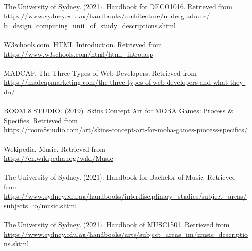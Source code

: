 \documentclass{article}
\begin{document}
	\\
	The University of Sydney. (2021). Handbook for DECO1016. Retrieved from\\ \url{https://www.sydney.edu.au/handbooks/architecture/undergraduate/
	b_design_computing_unit_of_study_descriptions.shtml}\\
	\\
	W3schools.com. HTML Introduction. Retrieved from\\
    \url{https://www.w3schools.com/html/html_intro.asp}\\
    \\
    MADCAP. The Three Types of Web Developers. Retrieved from\\
    \url{https://madcapmarketing.com/the-three-types-of-web-developers-and-what-they-do/}\\
    \\
    ROOM 8 STUDIO. (2019). Skins Concept Art for MOBA Games: Process & Specifies. Retrieved from\\
    \url{https://room8studio.com/art/skins-concept-art-for-moba-games-process-specifics/}\\
    \\
    Wekipedia. Music. Retrieved from\\
    \url{https://en.wikipedia.org/wiki/Music}\\
    \\
    The University of Sydney. (2021). Handbook for Bachelor of Music. Retrieved from\\
    \url{https://www.sydney.edu.au/handbooks/interdisciplinary_studies/subject_areas/subjects_io/music.shtml}\\
    \\
    The University of Sydney. (2021). Handbook of MUSC1501. Retrieved from\\
    \url{https://www.sydney.edu.au/handbooks/arts/subject_areas_im/music_descriptions.shtml}\\
    \\
    
\end{document}
